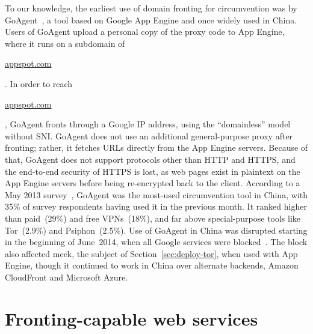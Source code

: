 \documentclass{sig-alternate}
\newcommand{\meek}{meek\xspace}
\def\urll#1{\begin{NoHyper}\url{#1}\end{NoHyper}}
\begin{document}
To our knowledge,
the earliest use of domain fronting for circumvention
was by GoAgent~\cite{goagent},
a tool based on Google App Engine and
once widely used in China.
Users of GoAgent upload
a personal copy of the proxy code to App Engine,
where it runs on a subdomain of \urll{appspot.com}.
In order to reach \urll{appspot.com},
GoAgent fronts through a Google IP address,
using the ``domainless'' model without SNI.
GoAgent does not use an additional general-purpose proxy after fronting;
rather, it fetches URLs directly from the App Engine servers.
Because of that, GoAgent does not support protocols other than HTTP and HTTPS,
and the end-to-end security of HTTPS is lost,
as web pages exist in plaintext on the App Engine servers before being re-encrypted back to the client.
According to a May 2013 survey~\cite{collateral-freedom},
GoAgent was the most-used circumvention tool in
China, with 35\% of survey respondents having used it in the previous month.
It ranked higher than paid~(29\%) and free VPNs~(18\%), and far
above special-purpose tools like Tor~(2.9\%) and Psiphon~(2.5\%).
Use of GoAgent in China was disrupted starting in the beginning of June~2014,
when all Google services were blocked~\cite{cn-google-block}.
The block also affected meek, the subject of Section~\ref{sec:deploy-tor},
when used with App Engine, though it continued to work in China over alternate backends,
Amazon CloudFront and Microsoft Azure.





\section{Fronting-capable web services}
\label{sec:survey}
\end{document}
